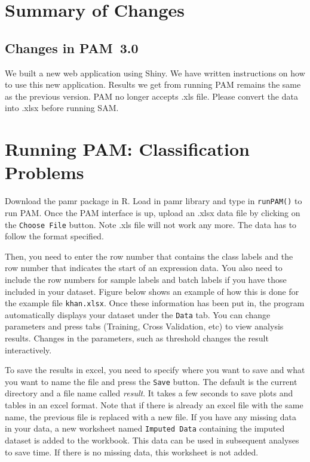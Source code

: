 \documentclass[12pt]{article}
\begin{document}
	
\section{Summary of Changes}
\subsection{Changes in PAM~3.0}
\label{sec:changes-2.0}
We built a new web application using Shiny. We have written instructions on how to use this new application. Results we get from running PAM remains the same as the previous version. PAM no longer accepts .xls file. Please convert the data into .xlsx before running SAM.
	
\section{Running PAM: Classification Problems}
Download the pamr package in R. Load in pamr library and type in {\tt runPAM()} to run PAM.
Once the PAM interface is up, upload an .xlsx data file by clicking on the {\tt Choose File} button. Note .xls
file will not work any more. The data has to follow the format specified.

Then, you need to enter the row number that contains the class labels and the row number that indicates
the start of an expression data. You also need to include the row numbers for sample labels and batch labels
if you have those included in your dataset. Figure below shows an example of how this is done for the example file
{\tt khan.xlsx}. Once these information has been put in, the program automatically displays your dataset
under the {\tt Data} tab. You can change
parameters and press tabs (Training, Cross Validation, etc) to view analysis results.
Changes in the parameters, such as threshold changes the result interactively.
 
To save the results in excel, you need to specify where you want to save and what you want
to name the file and press the {\tt Save} button. The default is the current directory and 
a file name called \emph{result}. It takes a few seconds to save plots and tables
in an excel format. Note that if there is already an excel file with the same name, the previous 
file is replaced with a new file. If you have any missing data in your data, a new worksheet named
{\tt Imputed Data} containing the imputed dataset is added
to the workbook. This data can be used in subsequent analyses to save
time. If there is no missing data, this worksheet is not added.
\end{document}

